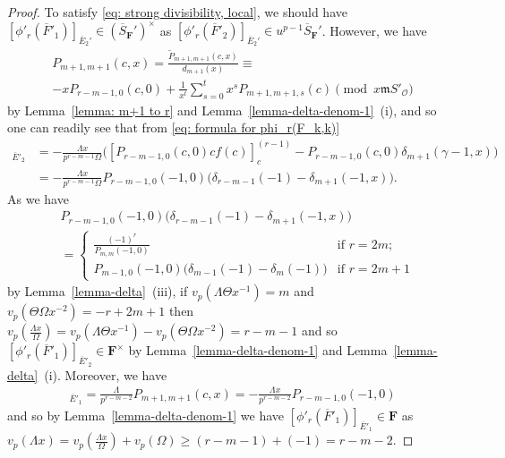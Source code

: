\documentclass[11pt]{amsart}
\theoremstyle{definition}
\numberwithin{equation}{subsection}
\theoremstyle{plain}
\theoremstyle{plain}
\theoremstyle{plain}
\theoremstyle{plain}
\theoremstyle{plain}
\theoremstyle{plain}
\theoremstyle{plain}
\theoremstyle{plain}
\theoremstyle{plain}
\theoremstyle{plain}
\theoremstyle{plain}
\theoremstyle{plain}
\theoremstyle{definition}
\theoremstyle{definition}
\theoremstyle{definition}
\theoremstyle{remark}
\renewcommand{\(}{\textup{(}}
\renewcommand{\)}{\textup{)}}
\newcommand{\F}{\mathbf{F}}
\newcommand{\barS}{\overline{S}}
\newcommand{\fm}{\mathfrak{m}}
\newcommand{\cO}{\mathcal{O}}
\newcommand{\barE}{\overline{E}}
\newcommand{\barF}{\overline{F}}
\begin{document}
\begin{proof}
To satisfy \eqref{eq: strong divisibility, local}, we should have $[\phi'_r(\barF'_1)]_{\barE_2'}\in (\barS_\F')^\times$ as $[\phi'_r(\barF'_2)]_{\barE_2'}\in u^{p-1}\barS_\F'$. However, we have
\begin{multline}\label{eq: case k=m+1 strong div, 1}
P_{m+1,m+1}(c,x)=\frac{\tilde{P}_{m+1,m+1}(c,x)}{d_{m+1}(x)}\equiv \\
-xP_{r-m-1,0}(c,0) +\frac{1}{x^t}\sum_{s=0}^{t}x^s P_{m+1,m+1,s}(c)\pmod{x\fm S'_\cO}
\end{multline}
by Lemma~\ref{lemma: m+1 to r} and Lemma~\ref{lemma-delta-denom-1}~(i), and so one can readily see that from \eqref{eq: formula for phi_r(F_k,k)}
\begin{align*}
[\phi'_r(\barF'_1)]_{\barE'_2}&=-\frac{\Lambda x}{p^{r-m-1}\Omega} \big([P_{r-m-1,0}(c,0)cf(c)]_c^{(r-1)}-P_{r-m-1,0}(c,0)\delta_{m+1}(\gamma-1,x)\big)\\
&=-\frac{\Lambda x}{p^{r-m-1}\Omega} P_{r-m-1,0}(-1,0)\big(\delta_{r-m-1}(-1)-\delta_{m+1}(-1,x)\big).
\end{align*}
As we have
\begin{align*}
&P_{r-m-1,0}(-1,0)\big(\delta_{r-m-1}(-1)-\delta_{m+1}(-1,x)\big)\\
&=\begin{cases}
   \frac{(-1)^r}{P_{m,m}(-1,0)}&\mbox{if }r=2m;\\
   P_{m-1,0}(-1,0)\big(\delta_{m-1}(-1)-\delta_{m}(-1)\big)&\mbox{if }r=2m+1
  \end{cases}
\end{align*}
by Lemma~\ref{lemma-delta}~(iii), if $v_p(\Lambda\Theta x^{-1})=m$ and $v_p(\Theta\Omega x^{-2})=-r+2m+1$ then $v_p(\frac{\Lambda x}{\Omega})=v_p(\Lambda\Theta x^{-1})-v_p(\Theta\Omega x^{-2})=r-m-1$ and so $[\phi'_r(\barF'_1)]_{\barE'_2}\in\F^\times$ by Lemma~\ref{lemma-delta-denom-1} and Lemma~\ref{lemma-delta}~(i). Moreover, we have
\begin{align*}
[\phi'_r(\barF'_1)]_{\barE'_1}=\frac{\Lambda }{p^{r-m-2}}P_{m+1,m+1}(c,x)=-\frac{\Lambda x}{p^{r-m-2}}P_{r-m-1,0}(-1,0)
\end{align*}
and so by Lemma~\ref{lemma-delta-denom-1} we have $[\phi'_r(\barF'_1)]_{\barE'_1}\in\F$ as $v_p(\Lambda x)=v_p(\frac{\Lambda x}{\Omega})+v_p(\Omega)\geq (r-m-1)+(-1)=r-m-2$.


\end{proof}
\end{document}
